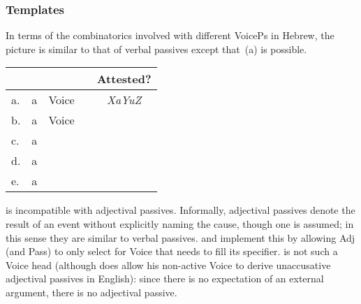 

	    \subsubsection{Templates} \label{passn:adjpass:a:temp}
In terms of the combinatorics involved with different VoicePs in Hebrew, the picture is similar to that of verbal passives except that~(\nextx a) is possible.
\ex \begin{tabular}{llllc}
	& & & & Attested? \\\hline
	a.& a	&	Voice	& 		& \emph{XaYuZ} \\
	b.& a	& Voice		& \va	& {\mpua} \\
	c.& a	& {\vz}		& 		& \xmark\\
	d.& a	& {\vz}		&	\va	& \xmark\\
	e.& a	& {\vd}		&		& {\mhuf} \\
	\end{tabular}
\xe

{\vz} is incompatible with adjectival passives. Informally, adjectival passives denote the result of an event without explicitly naming the cause, though one is assumed; in this sense they are similar to verbal passives. \cite{alexiadouetal14} and \cite{bruening14nllt} implement this by allowing Adj (and Pass) to only select for Voice that needs to fill its specifier. {\vz} is not such a Voice head (although \citealt{embick04li} does allow his non-active Voice to derive unaccusative adjectival passives in English): since there is no expectation of an external argument, there is no adjectival passive.


